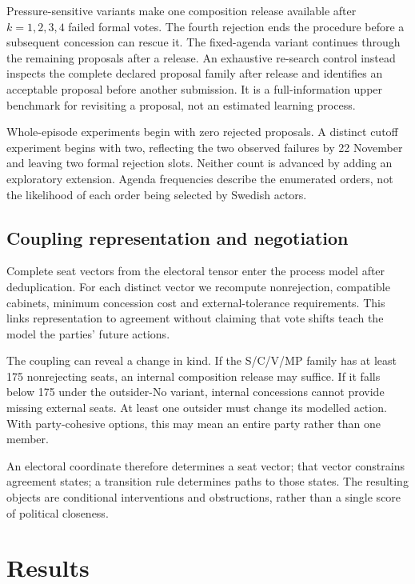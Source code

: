 \documentclass[11pt,a4paper]{article}
\begin{document}
Pressure-sensitive variants make one composition release available after \(k=1,2,3,4\) failed formal votes. The fourth rejection ends the procedure before a subsequent concession can rescue it. The fixed-agenda variant continues through the remaining proposals after a release. An exhaustive re-search control instead inspects the complete declared proposal family after release and identifies an acceptable proposal before another submission. It is a full-information upper benchmark for revisiting a proposal, not an estimated learning process.

Whole-episode experiments begin with zero rejected proposals. A distinct cutoff experiment begins with two, reflecting the two observed failures by 22 November and leaving two formal rejection slots. Neither count is advanced by adding an exploratory extension. Agenda frequencies describe the enumerated orders, not the likelihood of each order being selected by Swedish actors.

\subsection{Coupling representation and negotiation}

Complete seat vectors from the electoral tensor enter the process model after deduplication. For each distinct vector we recompute nonrejection, compatible cabinets, minimum concession cost and external-tolerance requirements. This links representation to agreement without claiming that vote shifts teach the model the parties' future actions.

The coupling can reveal a change in kind. If the S/C/V/MP family has at least 175 nonrejecting seats, an internal composition release may suffice. If it falls below 175 under the outsider-No variant, internal concessions cannot provide missing external seats. At least one outsider must change its modelled action. With party-cohesive options, this may mean an entire party rather than one member.

An electoral coordinate therefore determines a seat vector; that vector constrains agreement states; a transition rule determines paths to those states. The resulting objects are conditional interventions and obstructions, rather than a single score of political closeness.

\section{Results}
\end{document}
